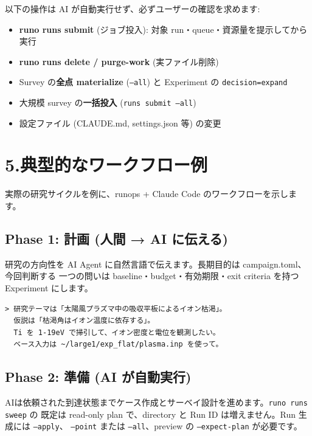 \documentclass[a4paper,11pt]{article}
\begin{document}
以下の操作は AI が自動実行せず、必ずユーザーの確認を求めます:

\begin{itemize}[nosep]
  \item \textbf{runo runs submit} (ジョブ投入): 対象 run・queue・資源量を提示してから実行
  \item \textbf{runo runs delete / purge-work} (実ファイル削除)
  \item Survey の\textbf{全点 materialize} (\texttt{--all}) と Experiment の \texttt{decision=expand}
  \item 大規模 survey の\textbf{一括投入} (\texttt{runs submit --all})
  \item 設定ファイル (CLAUDE.md, settings.json 等) の変更
\end{itemize}

\section*{\color{darkblue} 5.\quad 典型的なワークフロー例}

実際の研究サイクルを例に、runops + Claude Code のワークフローを示します。

\subsection*{\color{accent} Phase 1: 計画 (人間 → AI に伝える)}

研究の方向性を AI Agent に自然言語で伝えます。長期目的は campaign.toml、今回判断する
一つの問いは baseline・budget・有効期限・exit criteria を持つ Experiment にします。

\begin{lstlisting}[language={},commentstyle={}]
> 研究テーマは「太陽風プラズマ中の吸収平板によるイオン枯渇」。
  仮説は「枯渇角はイオン温度に依存する」。
  Ti を 1-19eV で掃引して、イオン密度と電位を観測したい。
  ベース入力は ~/large1/exp_flat/plasma.inp を使って。
\end{lstlisting}

\subsection*{\color{accent} Phase 2: 準備 (AI が自動実行)}

AIは依頼された到達状態までケース作成とサーベイ設計を進めます。\texttt{runo runs sweep} の
既定は read-only plan で、directory と Run ID は増えません。Run 生成には \texttt{--apply}、
\texttt{--point} または \texttt{--all}、preview の \texttt{--expect-plan} が必要です。
\end{document}
